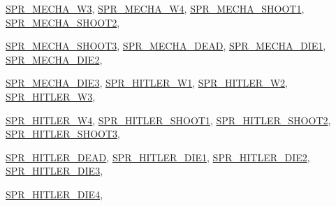 \begin{DoxyCompactItemize}
\par
\hyperlink{WL__DEF_8H_a99fb83031ce9923c84392b4e92f956b5a3c1efb4144e45fb8288af25e1e278c54}{SPR\_\-MECHA\_\-W3}, 
\hyperlink{WL__DEF_8H_a99fb83031ce9923c84392b4e92f956b5a3cfa8a11fed42e7ce2ff017aff38ad47}{SPR\_\-MECHA\_\-W4}, 
\hyperlink{WL__DEF_8H_a99fb83031ce9923c84392b4e92f956b5a8796a5b3bdec31deae15bfde81833334}{SPR\_\-MECHA\_\-SHOOT1}, 
\hyperlink{WL__DEF_8H_a99fb83031ce9923c84392b4e92f956b5a0ecdc23b042620adc0cd4d63dcafaa33}{SPR\_\-MECHA\_\-SHOOT2}, 
\par
\hyperlink{WL__DEF_8H_a99fb83031ce9923c84392b4e92f956b5a9ac3906bf8186309ec6cd826a8912e49}{SPR\_\-MECHA\_\-SHOOT3}, 
\hyperlink{WL__DEF_8H_a99fb83031ce9923c84392b4e92f956b5a8bd90e47b89219367e7d289b0dd299e8}{SPR\_\-MECHA\_\-DEAD}, 
\hyperlink{WL__DEF_8H_a99fb83031ce9923c84392b4e92f956b5a5c255c35ae63fbe899f60f5f021d7af3}{SPR\_\-MECHA\_\-DIE1}, 
\hyperlink{WL__DEF_8H_a99fb83031ce9923c84392b4e92f956b5ae997b87aea6f04ad2e5ce1dbe94caf9a}{SPR\_\-MECHA\_\-DIE2}, 
\par
\hyperlink{WL__DEF_8H_a99fb83031ce9923c84392b4e92f956b5abdef0d4db600b7bad752ebd8c8a7c708}{SPR\_\-MECHA\_\-DIE3}, 
\hyperlink{WL__DEF_8H_a99fb83031ce9923c84392b4e92f956b5a71dbd71717172eb17c2f4ae642fdf492}{SPR\_\-HITLER\_\-W1}, 
\hyperlink{WL__DEF_8H_a99fb83031ce9923c84392b4e92f956b5a6e213562de3a259023bc7ff403628fdb}{SPR\_\-HITLER\_\-W2}, 
\hyperlink{WL__DEF_8H_a99fb83031ce9923c84392b4e92f956b5a49753949b8bf1b9d3c23919cbee920ee}{SPR\_\-HITLER\_\-W3}, 
\par
\hyperlink{WL__DEF_8H_a99fb83031ce9923c84392b4e92f956b5a4dcd7fe65cd436b37cd0d443fc4cda61}{SPR\_\-HITLER\_\-W4}, 
\hyperlink{WL__DEF_8H_a99fb83031ce9923c84392b4e92f956b5acbcb2c1bbc710ae30ff38a858c68a32c}{SPR\_\-HITLER\_\-SHOOT1}, 
\hyperlink{WL__DEF_8H_a99fb83031ce9923c84392b4e92f956b5abb6e4d2a76f58cdb29fafe895fd60e67}{SPR\_\-HITLER\_\-SHOOT2}, 
\hyperlink{WL__DEF_8H_a99fb83031ce9923c84392b4e92f956b5a675020f30114da8c4264b87144a3b036}{SPR\_\-HITLER\_\-SHOOT3}, 
\par
\hyperlink{WL__DEF_8H_a99fb83031ce9923c84392b4e92f956b5a54fea5f1ea738d788f6fcb1ee2869786}{SPR\_\-HITLER\_\-DEAD}, 
\hyperlink{WL__DEF_8H_a99fb83031ce9923c84392b4e92f956b5a53bc5820f0d11f54ec408658eefe2b14}{SPR\_\-HITLER\_\-DIE1}, 
\hyperlink{WL__DEF_8H_a99fb83031ce9923c84392b4e92f956b5a3545056874b28b7fb5ce4e6ddbce9a22}{SPR\_\-HITLER\_\-DIE2}, 
\hyperlink{WL__DEF_8H_a99fb83031ce9923c84392b4e92f956b5ad681bfa5211042ba4b96572bd9a7ca3e}{SPR\_\-HITLER\_\-DIE3}, 
\par
\hyperlink{WL__DEF_8H_a99fb83031ce9923c84392b4e92f956b5ab7d8947a744eca49bbf0b136f7459f40}{SPR\_\-HITLER\_\-DIE4}, 

\end{DoxyCompactItemize}
